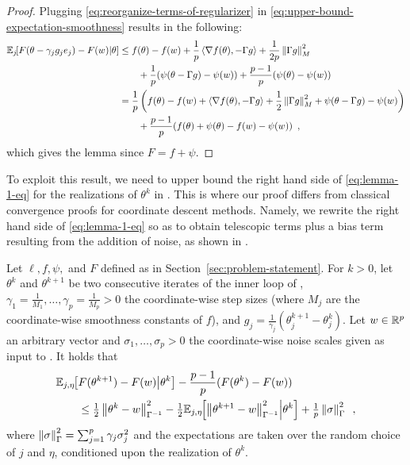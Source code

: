 \begin{proof}
  Plugging \eqref{eq:reorganize-terms-of-regularizer} in
  \eqref{eq:upper-bound-expectation-smoothness} results in the following:
  \begin{align}
    \condexpec{j}{F(\theta - \gamma_j g_j e_j) - F(w)}{\theta}
     & \le f(\theta) - f(w) + \frac{1}{p} \scalar{\nabla f(\theta)}{- \Gamma g}
    + \frac{1}{2p}\norm{\Gamma g}_{M}^2 \nonumber                                   \\
     & \qquad + \frac{1}{p} (\psi(\theta - \Gamma g) - \psi(w))
    + \frac{p - 1}{p} (\psi(\theta) - \psi(w))                                      \\
     & = \frac{1}{p} \left(f(\theta) - f(w) + \scalar{\nabla f(\theta)}{- \Gamma g}
    + \frac{1}{2}\norm{\Gamma g}_{M}^2
    + \psi(\theta - \Gamma g) - \psi(w)
    \right) \nonumber                                                               \\
     & \qquad + \frac{p - 1}{p} (f(\theta) + \psi(\theta) - f(w) - \psi(w))\enspace,         %
  \end{align}
  which gives the lemma since $F = f + \psi$.
\end{proof}

To exploit this result, we need to upper bound the right hand side of
\eqref{eq:lemma-1-eq} for the realizations of $\theta^k$ in .
This is where our proof differs from classical convergence proofs for coordinate
descent methods.
Namely, we rewrite the right hand side of
\eqref{eq:lemma-1-eq} so as to obtain telescopic terms plus a
bias term resulting from the addition of noise, as shown in .

\begin{lemma}
  \label{lemma:descent-lemma}
  Let $\ell, f, \psi,$ and $F$ defined as in Section~\ref{sec:problem-statement}.
  For $k > 0$, let $\theta^k$ and $\theta^{k+1}$ be two consecutive iterates
  of the
  inner loop of , $\gamma_1 = \frac{1}{M_1}, \dots, \gamma_p = \frac{1}{M_p} > 0$
  the coordinate-wise step sizes
  (where $M_j$ are the coordinate-wise smoothness constants of $f$),
  and $g_j = \frac{1}{\gamma_j} (\theta^{k+1}_j - \theta^k_j)$.
  Let $w \in \mathbb R^p$ an arbitrary vector and $\sigma_1, \dots, \sigma_p > 0$ the
  coordinate-wise noise scales given as input to .
  It holds that
  \begin{align}
    \label{eq:descent-lemma-eq}
    & \mathbb E_{j, \eta} \hspace{-0.29em} \left[ F(\theta^{k+1}) - F(w) \middle\vert \theta^k \right]
    - \frac{p - 1}{p} (F(\theta^k) - F(w)) \nonumber \\
    & \qquad \le \tfrac{1}{2} \left \lVert \theta^k - w \right \rVert_{\Gamma^{-1}}^2 - \tfrac{1}{2}\mathbb E_{j,\eta} \hspace{-0.29em} \left[ \left \lVert \theta^{k+1} - w \right \rVert_{\Gamma^{-1}}^2 \middle\vert \theta^k \right]
    + \tfrac{1}{p}\left \lVert \sigma \right \rVert_\Gamma^2\enspace,
  \end{align}
  where $\left \lVert \sigma \right \rVert_\Gamma^2 = \sum_{j=1}^p \gamma_j \sigma_j^2$ and the
  expectations are taken over the random choice of $j$ and $\eta$,
  conditioned upon the realization of $\theta^k$.
\end{lemma}

